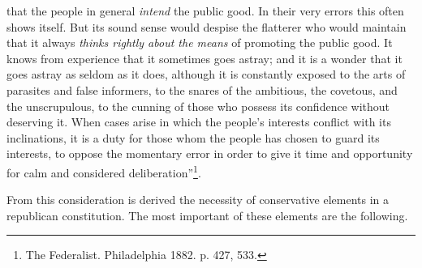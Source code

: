 \documentclass[12pt,a4paper,openany]{book}
\newcommand{\opage}[1]{\marginnote{\footnotesize\textit{[#1]}}}
\begin{document}
that the people in general \emph{intend} the public good. In their very
errors this often shows itself. But its sound sense
would despise the flatterer who would maintain that it always
\emph{thinks rightly about the means} of promoting the public good.
It knows from experience that it sometimes goes astray; and it is a wonder
that it goes astray as seldom as it does, although it
is constantly exposed to the arts of parasites and false informers,
to the snares of the ambitious, the covetous, and the unscrupulous,
to the cunning of those who possess its confidence without deserving it.
When cases arise in which the people's interests conflict
\opage{136}with its inclinations, it is a duty for those whom the people
has chosen to guard its interests, to oppose
the momentary error in order to give it time and
opportunity for calm and considered deliberation''\footnote{The Federalist. Philadelphia 1882. p. 427, 533.}.

From this consideration is derived the necessity of
conservative elements in a republican constitution. The most important
of these elements are the following.
\end{document}
